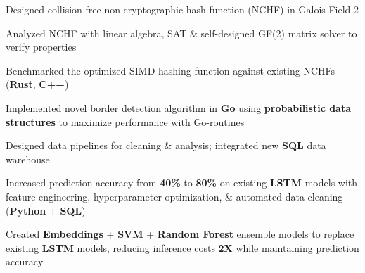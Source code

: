 \documentclass[]{chandan-cv}
\begin{document}
\begin{minipage}[t]{0.78\textwidth}
\begin{tightemize}
        \item Designed collision free non-cryptographic hash function (NCHF) in Galois Field 2
        \item Analyzed NCHF with linear algebra, SAT \& self-designed GF(2) matrix solver to verify properties
        \item Benchmarked the optimized SIMD hashing function against existing NCHFs (\textbf{Rust}, \textbf{C++})
        \item Implemented novel border detection algorithm in \textbf{Go} using \textbf{probabilistic data structures} to maximize performance with Go-routines
\end{tightemize}
\sectionsep

\begin{tightemize}
        \item Designed data pipelines for cleaning \& analysis; integrated new \textbf{SQL} data warehouse
        \item Increased prediction accuracy from \textbf{40\%} to \textbf{80\%} on existing \textbf{LSTM}
  models with feature engineering, hyperparameter optimization, \& automated data cleaning (\textbf{Python} + \textbf{SQL})
        \item Created \textbf{Embeddings} + \textbf{SVM} + \textbf{Random Forest} ensemble models to replace existing
  \textbf{LSTM} models, reducing inference costs \textbf{2X} while maintaining prediction accuracy
\end{tightemize}
\sectionsep
\end{minipage}

\newpage
\end{document}
